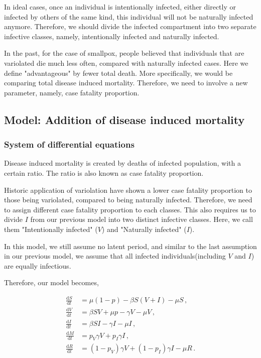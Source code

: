 \documentclass[12pt]{article}
\newcommand\dbyd[2]{\frac{\mathrm d{#1}}{\mathrm d{#2}}}
\newcommand{\pmV}{p_{V}}
\newcommand{\pmI}{p_{I}}
\begin{document}
In ideal cases, once an individual is intentionally infected, either directly or infected by others of the same kind, this individual will not be naturally infected anymore. Therefore, we should divide the infected compartment into two separate infective classes, namely, intentionally infected and naturally infected.

In the past, for the case of smallpox, people believed that individuals that are variolated die much less often, compared with naturally infected cases. Here we define "advantageous" by fewer total death. More specifically, we would be comparing total disease induced mortality. Therefore, we need to involve a new parameter, namely, case fatality proportion.

\subsection{Model: Addition of disease induced mortality}\label{Newborn section}
\subsubsection{System of differential equations}
Disease induced mortality is created by deaths of infected population, with a certain ratio. The ratio is also known as case fatality proportion. 

Historic application of variolation have shown a lower case fatality proportion to those being variolated, compared to being naturally infected. Therefore, we need to assign different case fatality proportion to each classes. This also requires us to divide $I$ from our previous model into two distinct infective classes. Here, we call them "Intentionally infected" ($V$) and "Naturally infected" ($I$). 

In this model, we still assume no latent period, and similar to the last assumption in our previous model, we assume that all infected individuals(including $V$ and $I$) are equally infectious.

Therefore, our model becomes,
\begin{linenomath*}
\begin{equation}\label{2}
\begin{split}
\dbyd{S}{t}&=\mu(1-p)- \beta S(V+I)-\mu S \,,\\
\dbyd{V}{t}&=\beta SV+\mu p-\gamma V -\mu V\,,\\
\dbyd{I}{t}&=\beta SI-\gamma I -\mu I\,,\\
\dbyd{M}{t}&=\pmV\gamma V+\pmI\gamma I\,,\\
\dbyd{R}{t}&=(1-\pmV)\gamma V+(1-\pmI)\gamma I-\mu R\,.
\end{split}
\end{equation}
\end{linenomath*}
\end{document}
